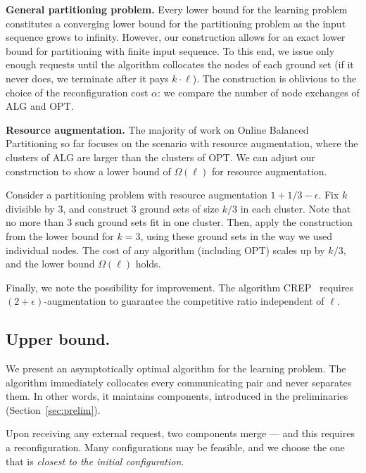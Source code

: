 \documentclass[manuscript,screen=true, review, anonymous]{acmart}
\newcommand{\OPT}{\textsf{OPT}\xspace}
\newcommand{\ALG}{\textsf{ALG}\xspace}
\begin{document}
\noindent
\textbf{General partitioning problem.}
Every lower bound for the learning problem constitutes a converging lower bound for the partitioning problem as the input sequence grows to infinity.
However, our construction allows for an exact lower bound for partitioning with finite input sequence.
To this end, we issue only enough requests until the algorithm collocates the nodes of each ground set (if it never does, we terminate after it pays $k\cdot \ell$).
The construction is oblivious to the choice of the reconfiguration cost $\alpha$: we compare the 	number of node exchanges of \ALG and \OPT.



\noindent
\textbf{Resource augmentation.}
The majority of work on Online Balanced Partitioning so far \cite{repartition-disc,sigmetrics19_partitioning} focuses on the scenario with resource augmentation, where the clusters of \ALG are larger than the clusters of \OPT.
We can adjust our construction to show a lower bound of $\Omega(\ell)$ for resource augmentation.

Consider a partitioning problem with resource augmentation $1+1/3-\epsilon$.
Fix $k$ divisible by $3$, and construct $3$ ground sets of size $k/3$ in each cluster.
Note that no more than $3$ such ground sets fit in one cluster.
Then, apply the construction from the lower bound for $k=3$, using these ground sets in the way we used individual nodes.
The cost of any algorithm (including \OPT) scales up by $k/3$, and the lower bound $\Omega(\ell)$ holds.

Finally, we note the possibility for improvement. The algorithm CREP~\cite{repartition-disc} requires $(2+\epsilon)$-augmentation to guarantee the competitive ratio independent of $\ell$.

\subsection{Upper bound.}
\label{sec:ppl}

We present an asymptotically optimal algorithm for the learning problem.
The algorithm immediately collocates every communicating pair and never separates them.
In other words, it maintains components, introduced in the preliminaries (Section~\ref{sec:prelim}).

Upon receiving any external request, two components merge --- and this requires a reconfiguration.
Many configurations may be feasible, and we choose the one that is \emph{closest to the initial configuration}.
\end{document}

